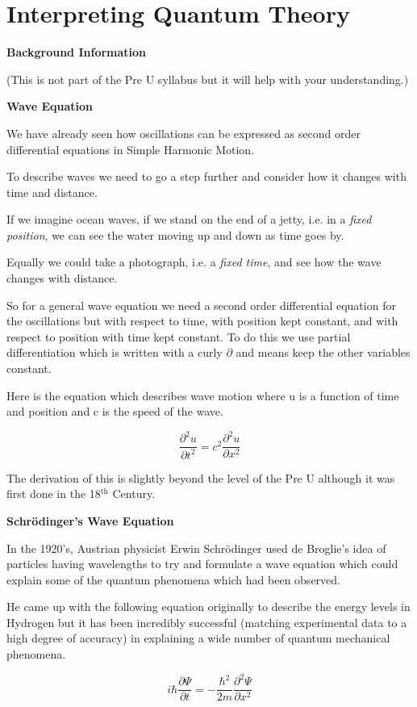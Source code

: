 \documentclass[main.tex]{subfiles}
\begin{document}
\chapter{Interpreting Quantum Theory}

\textbf{Background Information}

(This is not part of the Pre U syllabus but it will help with your understanding.)

\textbf{Wave Equation}

We have already seen how oscillations can be expressed as second order differential equations in Simple Harmonic Motion.

To describe waves we need to go a step further and consider how it changes with time and distance. 

If we imagine ocean waves, if we stand on the end of a jetty, i.e. in a \emph{fixed position}, we can see the water moving up and down as time goes by.

Equally we could take a photograph, i.e. a \emph{fixed time}, and see how the wave changes with distance.

So for a general wave equation we need a second order differential equation for the oscillations but with respect to time, with position kept constant, and with respect to position with time kept constant. To do this we use partial differentiation which is written with a curly $\partial$ and means keep the other variables constant. 

Here is the equation which describes wave motion where u is a function of time and position and c is the speed of the wave.

\[
\frac{\partial^2 u}{\partial t^2} = c^2 \frac{\partial^2 u}{\partial x^2}
\]

The derivation of this is slightly beyond the level of the Pre U although it was first done in the 18$^{\text{th}}$ Century.

\textbf{Schrödinger's Wave Equation}

In the 1920's, Austrian physicist Erwin Schrödinger used de Broglie's idea of particles having wavelengths to try and formulate a wave equation which could explain some of the quantum phenomena which had been observed.

He came up with the following equation originally to describe the energy levels in Hydrogen but it has been incredibly successful (matching experimental data to a high degree of accuracy) in explaining a wide number of quantum mechanical phenomena.

\[
i\hbar \frac{\partial \Psi}{\partial t} = -\frac{\hbar^2}{2m}
\frac{\partial^2 \Psi}{\partial x^2} 
\]
\end{document}
